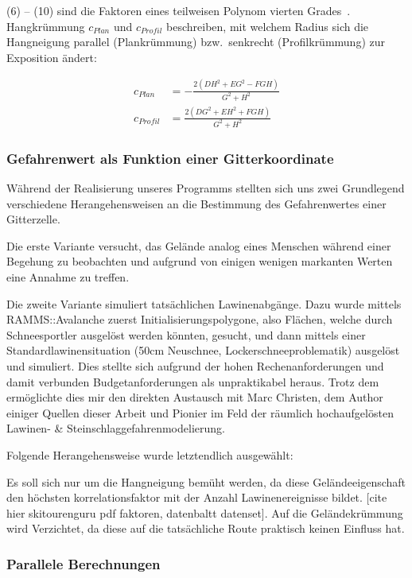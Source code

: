 (6) -- (10) sind die Faktoren eines teilweisen Polynom vierten Grades~\cite{gismath}.
Hangkrümmung $c_{Plan}$ und $c_{Profil}$ beschreiben, mit welchem Radius sich die Hangneigung parallel (Plankrümmung) bzw.\ senkrecht (Profilkrümmung) zur Exposition ändert:

\begin{align}
    c_{Plan} &= -\frac{{2(DH^2 + EG^2 - FGH)}}{{G^2 + H^2}}
    \\
    c_{Profil} &= \frac{{2(DG^2 + EH^2 + FGH)}}{{G^2 + H^2}}
\end{align}

\subsubsection{Gefahrenwert als Funktion einer Gitterkoordinate}
Während der Realisierung unseres Programms stellten sich uns zwei Grundlegend verschiedene Herangehensweisen an die Bestimmung des Gefahrenwertes einer Gitterzelle. 

Die erste Variante versucht, das Gelände analog eines Menschen während einer Begehung zu beobachten und aufgrund von einigen wenigen markanten Werten eine Annahme zu treffen.

Die zweite Variante simuliert tatsächlichen Lawinenabgänge. Dazu wurde mittels RAMMS::Avalanche zuerst Initialisierungspolygone, also Flächen, welche durch Schneesportler ausgelöst werden könnten, gesucht, und dann mittels einer Standardlawinensituation (50cm Neuschnee, Lockerschneeproblematik) ausgelöst und simuliert. Dies stellte sich aufgrund der hohen Rechenanforderungen und damit verbunden Budgetanforderungen als unpraktikabel heraus. Trotz dem ermöglichte dies mir den direkten Austausch mit Marc Christen, dem Author einiger Quellen dieser Arbeit und Pionier im Feld der räumlich hochaufgelösten Lawinen- & Steinschlaggefahrenmodelierung.

Folgende Herangehensweise wurde letztendlich ausgewählt:

Es soll sich nur um die Hangneigung bemüht werden, da diese Geländeeigenschaft den höchsten korrelationsfaktor mit der Anzahl Lawinenereignisse bildet. [cite hier skitourenguru pdf faktoren, datenbaltt datenset]. Auf die Geländekrümmung wird Verzichtet, da diese auf die tatsächliche Route praktisch keinen Einfluss hat. 

\subsubsection{Parallele Berechnungen}

